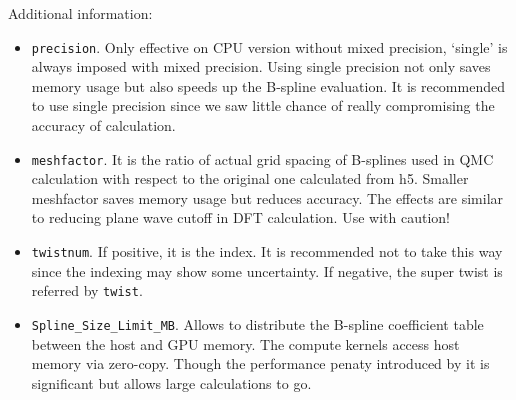 Additional information:
\begin{itemize}
\item \texttt{precision}. Only effective on CPU version without mixed precision, `single' is always imposed with mixed precision. Using single precision not only saves memory usage but also speeds up the B-spline evaluation. It is recommended to use single precision since we saw little chance of really compromising the accuracy of calculation.
\item \texttt{meshfactor}. It is the ratio of actual grid spacing of B-splines used in QMC calculation with respect to the original one calculated from h5. Smaller meshfactor saves memory usage but reduces accuracy. The effects are similar to reducing plane wave cutoff in DFT calculation. Use with caution! 
\item \texttt{twistnum}. If positive, it is the index. It is recommended not to take this way since the indexing may show some uncertainty. If negative, the super twist is referred by \texttt{twist}.
\item \texttt{Spline\_Size\_Limit\_MB}. Allows to distribute the B-spline coefficient table between the host and GPU memory. The compute kernels access host memory via zero-copy. Though the performance penaty introduced by it is significant but allows large calculations to go.
\end{itemize}
\label{sec:splinebasis}

